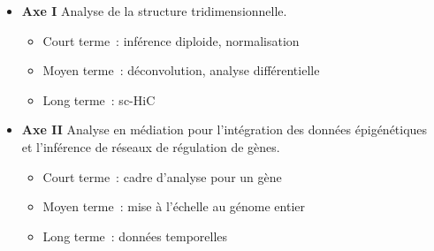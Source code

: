 \documentclass[11pt,xcolor=dvipsnames]{beamer}
\begin{document}
\begin{frame}
\begin{overlayarea}{12cm}{5cm}
\small
\begin{columns}
\begin{column}{0.7\linewidth}
\begin{itemize}[leftmargin=*]
\scriptsize
\item<4-> {\bf Axe I} \quad Analyse de la structure tridimensionnelle.
\begin{itemize}
\tiny
\item<4->[-] Court terme~: inférence diploide, normalisation
\item<4->[-] Moyen terme~: déconvolution, analyse
différentielle
\item<4->[-] Long terme~: sc-HiC
\end{itemize}
\item<5-> {\bf Axe II} \quad Analyse en médiation pour l'intégration des
données épigénétiques et l'inférence de réseaux de régulation de gènes.
\begin{itemize}
\tiny
\item<5->[-] Court terme~: cadre d'analyse pour un gène
\item<5->[-] Moyen terme~: mise à l'échelle au génome entier
\item<5->[-] Long terme~: données temporelles
\end{itemize}
\end{itemize}
\end{column}
\begin{column}{0.3\linewidth}
\begin{overlayarea}{0.9\linewidth}{2cm}
\end{overlayarea}
\end{column}
\end{columns}
\end{overlayarea}
\end{frame}
\end{document}
